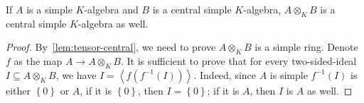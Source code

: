 \begin{theorem}
  \label{thm:tensor-csa}
  If $A$ is a simple $K$-algebra and $B$ is a central simple $K$-algebra,
  $A\otimes_{K}B$ is a central simple $K$-algebra as well. 
  \leanok
\end{theorem}
\begin{proof}
  By~\cref{lem:tensor-central}, we need to prove $A\otimes_{K}B$ is a simple
  ring. Denote $f$ as the map $A\to A\otimes_{K}B$. It is sufficient to prove
  that for every two-sided-ideal $I\subseteq A\otimes_{K}B$, we have
  $I = \left\langle f\left(f^{-1}\left(I\right)\right)\right\rangle$. Indeed,
  since $A$ is simple $f^{-1}\left(I\right)$ is either $\left\{0\right\}$ or
  $A$, if it is $\left\{0\right\}$, then $I=\left\{0\right\}$; if it is $A$,
  then $I$ is $A$ as well.


\end{proof}
